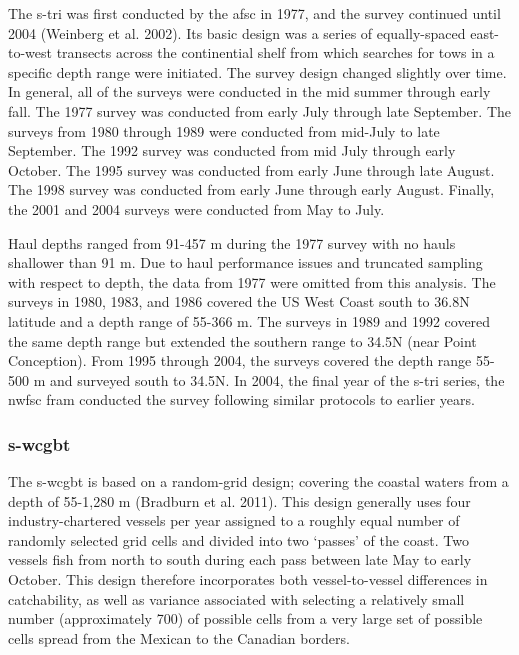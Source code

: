 \documentclass[11pt,
  english,
  letterpaper,
]{article}
\begin{document}
The \gls{s-tri} was first conducted by the \gls{afsc} in 1977, and the survey continued until 2004 (Weinberg et al. 2002). Its basic design was a series of equally-spaced east-to-west transects across the continential shelf from which searches for tows in a specific depth range were initiated. The survey design changed slightly over time. In general, all of the surveys were conducted in the mid summer through early fall. The 1977 survey was conducted from early July through late September. The surveys from 1980 through 1989 were conducted from mid-July to late September. The 1992 survey was conducted from mid July through early October. The 1995 survey was conducted from early June through late August. The 1998 survey was conducted from early June through early August. Finally, the 2001 and 2004 surveys were conducted from May to July.

Haul depths ranged from 91-457 m during the 1977 survey with no hauls shallower than 91 m. Due to haul performance issues and truncated sampling with respect to depth, the data from 1977 were omitted from this analysis. The surveys in 1980, 1983, and 1986 covered the US West Coast south to 36.8\textdegree N latitude and a depth range of 55-366 m. The surveys in 1989 and 1992 covered the same depth range but extended the southern range to 34.5\textdegree N (near Point Conception). From 1995 through 2004, the surveys covered the depth range 55-500 m and surveyed south to 34.5\textdegree N. In 2004, the final year of the \gls{s-tri} series, the \gls{nwfsc} \gls{fram} conducted the survey following similar protocols to earlier years.

\hypertarget{section-3}{%
\subsubsection{\texorpdfstring{\acrlong{s-wcgbt}}{}}\label{section-3}}

The \Gls{s-wcgbt} is based on a random-grid design; covering the coastal waters from a depth of 55-1,280 m (Bradburn et al. 2011). This design generally uses four industry-chartered vessels per year assigned to a roughly equal number of randomly selected grid cells and divided into two `passes' of the coast. Two vessels fish from north to south during each pass between late May to early October. This design therefore incorporates both vessel-to-vessel differences in catchability, as well as variance associated with selecting a relatively small number (approximately 700) of possible cells from a very large set of possible cells spread from the Mexican to the Canadian borders.
\end{document}
